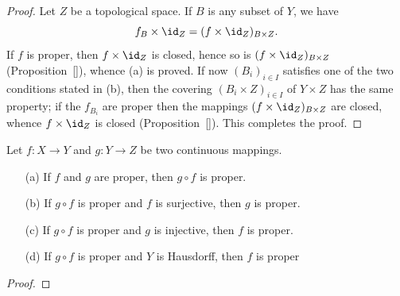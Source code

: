 \begin{proof}
Let $Z$ be a topological space. If $B$ is any subset of $Y$, we have
\[f_B\times\id_Z=(f\times\id_Z)_{B\times Z}.\]
If $f$ is proper, then $f\times\id_Z$ is closed, hence so is $(f\times\id_Z)_{B\times Z}$ (Proposition~\ref{}), whence (a) is proved. If now $(B_i)_{i\in I}$ satisfies one of the two conditions stated in (b), then the covering $(B_i\times Z)_{i\in I}$ of $Y\times Z$ has the same property; if the $f_{B_i}$ are proper then the mappings $(f\times\id_Z)_{B\times Z}$ are closed, whence $f\times\id_Z$ is closed (Proposition~\ref{}). This completes the proof.
\end{proof}
\begin{proposition}
Let $f:X\to Y$ and $g:Y\to Z$ be two continuous mappings.
\begin{itemize}
\item[(a)] If $f$ and $g$ are proper, then $g\circ f$ is proper.
\item[(b)] If $g\circ f$ is proper and $f$ is surjective, then $g$ is proper.
\item[(c)] If $g\circ f$ is proper and $g$ is injective, then $f$ is proper. 
\item[(d)] If $g\circ f$ is proper and $Y$ is Hausdorff, then $f$ is proper   
\end{itemize}
\end{proposition}
\begin{proof}

\end{proof}
